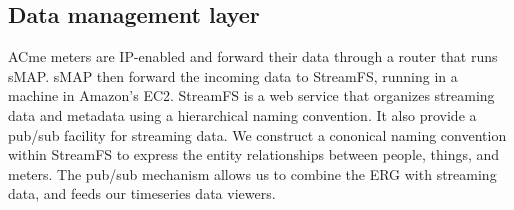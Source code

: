 


\subsection{Data management layer}
ACme meters are IP-enabled and forward their data through a router that runs sMAP.  sMAP then forward the incoming data
to StreamFS, running in a machine in Amazon's EC2.  StreamFS is a web service that organizes streaming data and metadata using
a hierarchical naming convention.  It also provide a pub/sub facility for streaming data.  We construct 
a cononical naming convention within StreamFS to express the entity relationships between people, things, and meters.  The pub/sub
mechanism allows us to combine the ERG with streaming data, and feeds our timeseries data viewers.

